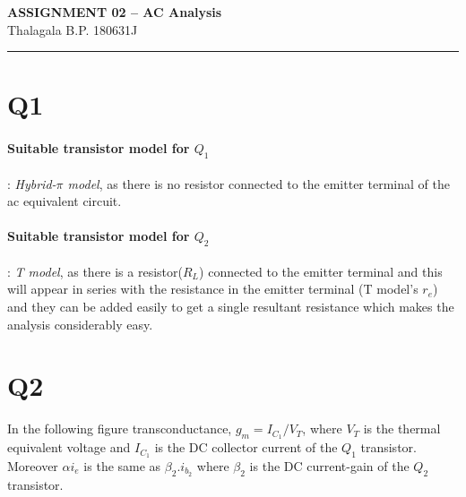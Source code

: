 \documentclass[a4paper,11pt]{article}%
\begin{document}
	\begin{center}
		{\large \textbf{ASSIGNMENT 02 – AC Analysis}}\\
		Thalagala B.P.\hspace{0.5cm} 180631J 
	\end{center}
	\hrule


\section*{Q1}

\paragraph*{Suitable transistor model for $Q_1$}: \textit{Hybrid-$\pi$ model}, as there is no resistor connected to the emitter terminal of the ac equivalent circuit.
 
\paragraph*{Suitable transistor model for $Q_2$}: \textit{T model}, as there is a resistor($R_L$)  connected to the emitter terminal and this will appear in series with the resistance in the emitter terminal (T model's $r_e$)  and they can be added easily to get a single resultant resistance which makes the analysis considerably easy.

\section*{Q2}
In the following figure transconductance, $g_m = I_{C_1}/{V_T}$, where $V_T$ is the thermal equivalent voltage and $I_{C_1}$ is the DC collector current of the $Q_1$ transistor. Moreover $\alpha i_e$ is the same as $\beta_2.i_{b_2}$ where $\beta_2$ is the DC current-gain of the $Q_2$ transistor.
\end{document}
